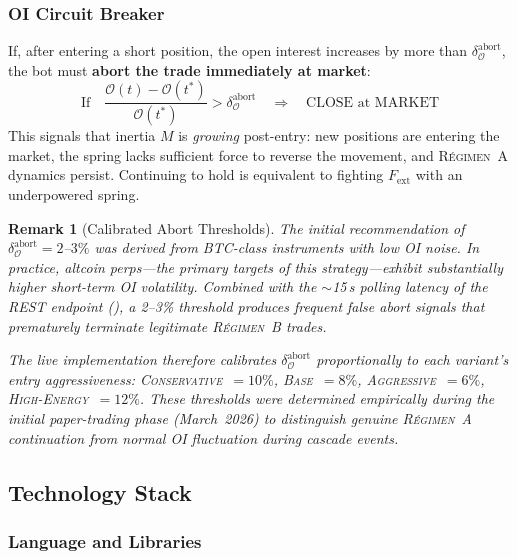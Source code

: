 \documentclass[11pt,a4paper]{article}
\newtheorem{remark}{Remark}[section]
\newcommand{\Fext}{F_{\mathrm{ext}}}
\newcommand{\regime}[1]{\textsc{R\'{e}gimen~#1}}
\newcommand{\OI}{\mathcal{O}}
\begin{document}
\subsubsection{OI Circuit Breaker}

\begin{tcolorbox}[boxstyle, title=\regime{A} Abort Rule]
If, after entering a short position, the open interest increases by more 
than $\delta_{\OI}^{\mathrm{abort}}$, the bot must 
\textbf{abort the trade immediately at market}:
\begin{equation}
\label{eq:circuit}
\text{If}\quad \frac{\OI(t) - \OI(t^*)}{\OI(t^*)} > \delta_{\OI}^{\mathrm{abort}}
\quad\Longrightarrow\quad \text{CLOSE at MARKET}
\end{equation}
This signals that inertia $M$ is \emph{growing} post-entry: new positions are 
entering the market, the spring lacks sufficient force to reverse the movement, 
and \regime{A} dynamics persist. Continuing to hold is equivalent to fighting 
$\Fext$ with an underpowered spring.
\end{tcolorbox}

\begin{remark}[Calibrated Abort Thresholds]
\label{rem:oi_abort}
The initial recommendation of $\delta_{\OI}^{\mathrm{abort}} = 2$--$3\%$ was 
derived from BTC-class instruments with low OI noise. In practice, altcoin 
perps---the primary targets of this strategy---exhibit substantially higher 
short-term OI volatility. Combined with the $\sim$15\,s polling latency of 
the REST endpoint (), a 2--3\% threshold produces 
frequent false abort signals that prematurely terminate legitimate 
\regime{B} trades.

The live implementation therefore calibrates $\delta_{\OI}^{\mathrm{abort}}$
proportionally to each variant's entry aggressiveness:
\textsc{Conservative}~$= 10\%$, \textsc{Base}~$= 8\%$, 
\textsc{Aggressive}~$= 6\%$, \textsc{High-Energy}~$= 12\%$.
These thresholds were determined empirically during the initial paper-trading 
phase (March~2026) to distinguish genuine \regime{A} continuation from 
normal OI fluctuation during cascade events.
\end{remark}


\subsection{Technology Stack}

\subsubsection{Language and Libraries}
\end{document}
